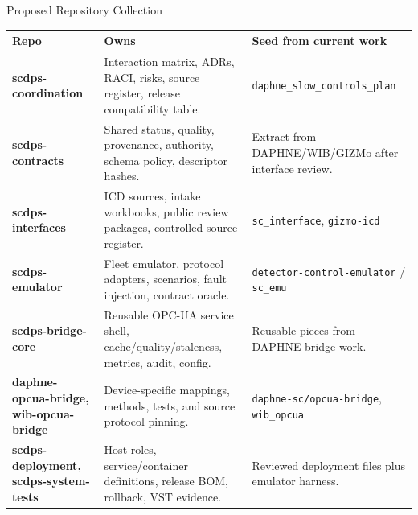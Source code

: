 \documentclass[aspectratio=169,10pt]{beamer}
\begin{document}
\begin{frame}{Proposed Repository Collection}
\scriptsize
\renewcommand{\arraystretch}{1.15}
\begin{tabularx}{\textwidth}{>{\bfseries\ttfamily}p{} X p{}}
\toprule
Repo & Owns & Seed from current work \\
\midrule
scdps-coordination &
Interaction matrix, ADRs, RACI, risks, source register, release compatibility table. &
\texttt{daphne\_slow\_controls\_plan} \\
\addlinespace
scdps-contracts &
Shared status, quality, provenance, authority, schema policy, descriptor hashes. &
Extract from DAPHNE/WIB/GIZMo after interface review. \\
\addlinespace
scdps-interfaces &
ICD sources, intake workbooks, public review packages, controlled-source register. &
\texttt{sc\_interface}, \texttt{gizmo-icd} \\
\addlinespace
scdps-emulator &
Fleet emulator, protocol adapters, scenarios, fault injection, contract oracle. &
\texttt{detector-control-emulator} / \texttt{sc\_emu} \\
\addlinespace
scdps-bridge-core &
Reusable OPC-UA service shell, cache/quality/staleness, metrics, audit, config. &
Reusable pieces from DAPHNE bridge work. \\
\addlinespace
daphne-opcua-bridge, wib-opcua-bridge &
Device-specific mappings, methods, tests, and source protocol pinning. &
\texttt{daphne-sc/opcua-bridge}, \texttt{wib\_opcua} \\
\addlinespace
scdps-deployment, scdps-system-tests &
Host roles, service/container definitions, release BOM, rollback, VST evidence. &
Reviewed deployment files plus emulator harness. \\
\bottomrule
\end{tabularx}
\end{frame}
\end{document}
